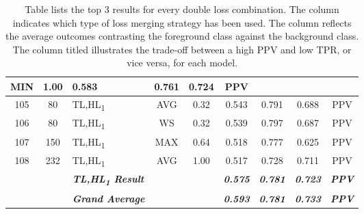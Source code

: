\begin{table}[H]
{\begin{tabular}{cc|l|cc|c|c|c|c|}
    \multicolumn{1}{c|}{MIN} &
    1.00 &
    0.583 &
    0.761 &
    0.724 &
    PPV \\ \hline
  \multicolumn{1}{|c|}{105} &
    80 &
    TL,HL\textsubscript{1} &
    \multicolumn{1}{c|}{AVG} &
    0.32 &
    0.543 &
    0.791 &
    0.688 &
    PPV \\ \hline
  \multicolumn{1}{|c|}{106} &
    80 &
    TL,HL\textsubscript{1} &
    \multicolumn{1}{c|}{WS} &
    0.32 &
    0.539 &
    0.797 &
    0.687 &
    PPV \\ \hline
  \multicolumn{1}{|c|}{107} &
    150 &
    TL,HL\textsubscript{1} &
    \multicolumn{1}{c|}{MAX} &
    0.64 &
    0.518 &
    0.777 &
    0.625 &
    PPV \\ \hline
  \multicolumn{1}{|c|}{108} &
    232 &
    TL,HL\textsubscript{1} &
    \multicolumn{1}{c|}{AVG} &
    1.00 &
    0.517 &
    0.728 &
    0.711 &
    PPV \\ \hline
   &
     &
    \textit{\textbf{TL,HL\textsubscript{1} Result}} &
     &
     &
    \textit{\textbf{0.575}} &
    \textit{\textbf{0.781}} &
    \textit{\textbf{0.723}} &
    \textit{\textbf{PPV}} \\ \cline{3-3} \cline{6-9} 
   &
     &
    \textit{\textbf{Grand Average}} &
     &
     &
    \textit{\textbf{0.593}} &
    \textit{\textbf{0.781}} &
    \textit{\textbf{0.733}} &
    \textit{\textbf{PPV}} \\ \cline{3-3} \cline{6-9} 
  \end{tabular}%
  }
  \caption[Top double discrete loss combination results (Skin Lesion)]{Table lists the top 3 results for every double loss combination. The column  indicates which type of loss merging strategy has been used. The  column reflects the average outcomes contrasting the foreground class against the background class. The column titled  illustrates the trade-off between a high \acf{PPV} and low \acf{TPR}, or vice versa, for each model.}
  \label{tab:loss_combination_results_melanoma_double_long}
  \end{table}